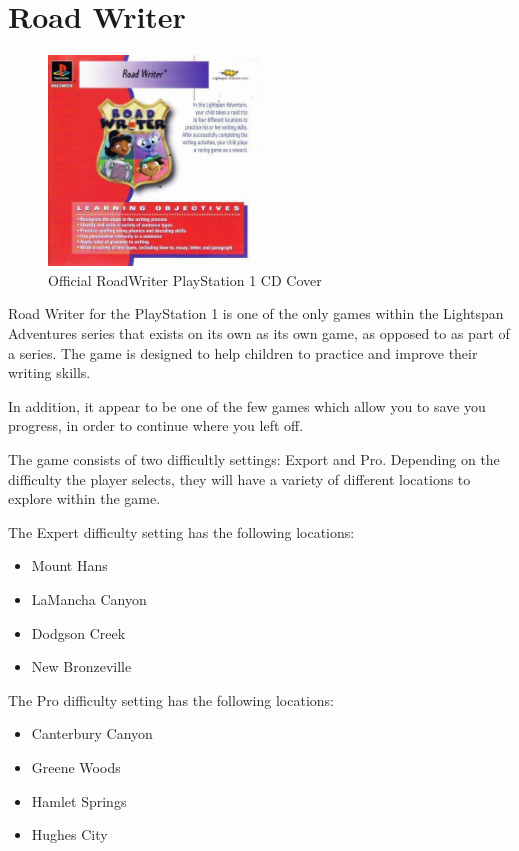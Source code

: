\chapter{Road Writer}

\begin{figure}[H]
    \centering
    \includegraphics[width=0.5\textwidth]{"./Games/RoadWriter/Images/RoadWriterCDCover.jpg"}
    \caption{Official RoadWriter PlayStation 1 CD Cover}
\end{figure}

Road Writer for the PlayStation 1 is one of the only games within the Lightspan Adventures series that exists on its own as its own game, as opposed to as part of a series.
The game is designed to help children to practice and improve their writing skills.

In addition, it appear to be one of the few games which allow you to save you progress, in order to continue where you left off.

The game consists of two difficultly settings: Export and Pro.
Depending on the difficulty the player selects, they will have a variety of different locations to explore within the game.

The Expert difficulty setting has the following locations:

\begin{itemize}
    \item Mount Hans
    \item LaMancha Canyon
    \item Dodgson Creek
    \item New Bronzeville
\end{itemize}

The Pro difficulty setting has the following locations:

\begin{itemize}
    \item Canterbury Canyon
    \item Greene Woods
    \item Hamlet Springs
    \item Hughes City
\end{itemize}


